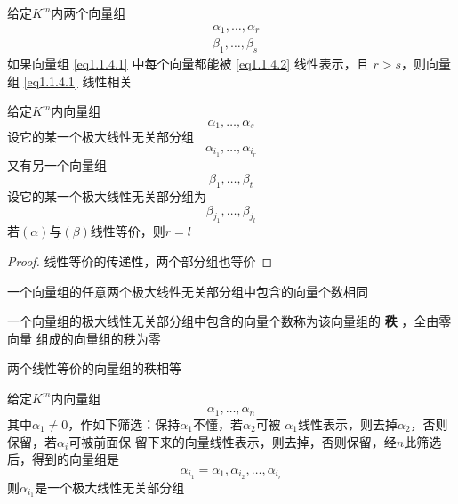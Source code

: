 \documentclass[11pt]{article}
\begin{document}
\begin{proposition}[]
给定\(K^m\)内两个向量组
\begin{align}
&\alpha_1,\dots,\alpha_r\label{eq1.1.4.1}\\
&\beta_1,\dots,\beta_s\label{eq1.1.4.2}
\end{align}
如果向量组 \eqref{eq1.1.4.1} 中每个向量都能被 \eqref{eq1.1.4.2} 线性表示，且
\(r\iffalse<\fi>s\)，则向量组 \eqref{eq1.1.4.1} 线性相关
\end{proposition}

\begin{proposition}[]
\label{prop2.1.5}
给定\(K^m\)内向量组
\begin{equation*}
\alpha_1,\dots,\alpha_s
\end{equation*}
设它的某一个极大线性无关部分组
\begin{equation*}
\alpha_{i_1},\dots,\alpha_{i_r}
\end{equation*}
又有另一个向量组
\begin{equation*}
\beta_1,\dots,\beta_t
\end{equation*}
设它的某一个极大线性无关部分组为
\begin{equation*}
\beta_{j_1},\dots,\beta_{j_l}
\end{equation*}
若\((\alpha)\)与\((\beta)\)线性等价，则\(r=l\)
\end{proposition}

\begin{proof}
线性等价的传递性，两个部分组也等价
\end{proof}

\begin{corollary}[]
一个向量组的任意两个极大线性无关部分组中包含的向量个数相同
\end{corollary}

\begin{definition}[]


一个向量组的极大线性无关部分组中包含的向量个数称为该向量组的 \textbf{秩} ，全由零向量
组成的向量组的秩为零
\end{definition}


\begin{corollary}[]
\label{cor2.1.5.2}
两个线性等价的向量组的秩相等
\end{corollary}

\begin{proposition}[]
给定\(K^m\)内向量组
\begin{equation*}
\alpha_1,\dots,\alpha_n
\end{equation*}
其中\(\alpha_1\neq0\)，作如下筛选：保持\(\alpha_1\)不懂，若\(\alpha_2\)可被
\(\alpha_1\)线性表示，则去掉\(\alpha_2\)，否则保留，若\(\alpha_i\)可被前面保
留下来的向量线性表示，则去掉，否则保留，经\(n\)此筛选后，得到的向量组是
\begin{equation*}
\alpha_{i_1}=\alpha_1,\alpha_{i_2},\dots,\alpha_{i_r}
\end{equation*}
则\(\alpha_{i_1}\)是一个极大线性无关部分组
\end{proposition}
\end{document}
